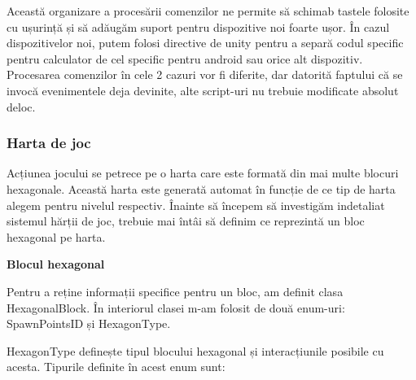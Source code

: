 \documentclass[12pt, a4paper]{article}
\begin{document}
	Această organizare a procesării comenzilor ne permite să schimab tastele folosite cu ușurință și să adăugăm suport pentru dispozitive noi foarte ușor. În cazul dispozitivelor noi, putem folosi directive de unity pentru a separă codul specific pentru calculator de cel specific pentru android sau orice alt dispozitiv. Procesarea comenzilor în cele 2 cazuri vor fi diferite, dar datorită faptului că se invocă evenimentele deja devinite, alte script-uri nu trebuie modificate absolut deloc.
	
	
	
	
	
	\subsubsection{Harta de joc}
	
	Acțiunea jocului se petrece pe o harta care este formată din mai multe blocuri hexagonale. Această harta este generată automat în funcție de ce tip de harta alegem pentru nivelul respectiv. Înainte să începem să investigăm indetaliat sistemul hărții de joc, trebuie mai întâi să definim ce reprezintă un bloc hexagonal pe harta.
	\newline
	
	
	
	
	
	\textbf{Blocul hexagonal}
	
	Pentru a reține informații specifice pentru un bloc, am definit clasa HexagonalBlock. În interiorul clasei m-am folosit de două enum-uri: SpawnPointsID și HexagonType.
	\newline
	
	HexagonType definește tipul blocului hexagonal și interacțiunile posibile cu acesta. Tipurile definite în acest enum sunt:
	
\end{document}
